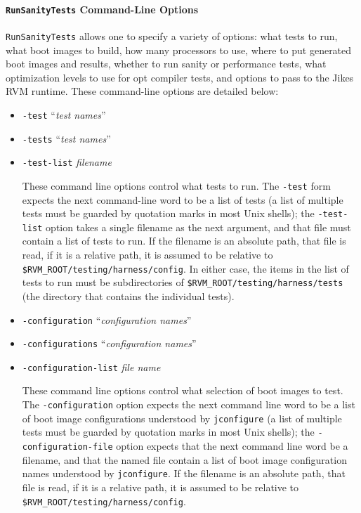 \paragraph{{\tt{RunSanityTests}} Command-Line Options}

 {\tt{RunSanityTests}} allows one to specify a variety of options:
what tests to run, what boot images to build, how many processors to
use, where to put generated boot images and results, whether to run
sanity or performance tests, what optimization levels to use for opt
compiler tests, and options to pass to the Jikes RVM runtime.  These
command-line options are detailed below:

\begin{itemize}
\item{\tt{-test}} ``{\em{test names}}''
\item{\tt{-tests}} ``{\em{test names}}''
\item{\tt{-test-list}} {\em{filename}}

 These command line options control what tests to run.  The
{\tt{-test}} form expects the next command-line word to be a list
of tests (a list of multiple tests must be guarded by quotation marks
in most Unix shells); the {\tt{-test-list}} option takes a single
filename as the next argument, and that file must contain a list of
tests to run.  If the filename is an absolute path, that file is read,
if it is a relative path, it is assumed to be relative to
{\tt \$RVM\_\-ROOT/testing/harness/config}.  In either case, the items in the
list of tests to run must be subdirectories of
{\tt \$RVM\_\-ROOT/testing/harness/tests} (the directory that contains the
individual tests).

\item{\tt{-configuration}} ``{\em{configuration names}}''
\item{\tt{-configurations}} ``{\em{configuration names}}''
\item{\tt{-configuration-list}} {\em{file name}}

These command line options control what selection of boot images to
test.  The \texttt{-con\-fi\-gu\-ra\-tion} option expects the next command
line word to be a list of boot image configurations understood by
\texttt{jconfigure} (a list of multiple tests must be guarded by quotation
marks in most Unix\Rweb{} shells); the {\tt{-configuration-file}} option
expects that the next command line word be a filename, and that the
named file contain a list of boot image configuration names understood
by \texttt{jconfigure}.  If the filename is an absolute path, that file is
read, if it is a relative path, it is assumed to be relative to
{\tt \$RVM\_\-ROOT/testing/harness/config}.


\end{itemize}
